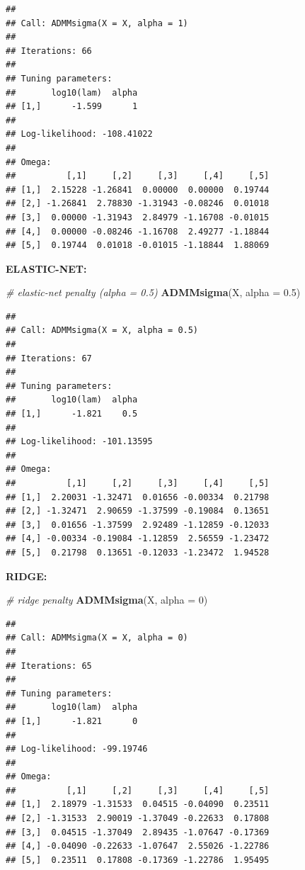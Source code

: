 \documentclass[12pt,]{book}
\newenvironment{Shaded}{\begin{snugshade}}{\end{snugshade}}
\newcommand{\CommentTok}[1]{\textcolor[rgb]{0.56,0.35,0.01}{\textit{#1}}}
\newcommand{\DataTypeTok}[1]{\textcolor[rgb]{0.13,0.29,0.53}{#1}}
\newcommand{\DecValTok}[1]{\textcolor[rgb]{0.00,0.00,0.81}{#1}}
\newcommand{\FloatTok}[1]{\textcolor[rgb]{0.00,0.00,0.81}{#1}}
\newcommand{\KeywordTok}[1]{\textcolor[rgb]{0.13,0.29,0.53}{\textbf{#1}}}
\newcommand{\NormalTok}[1]{#1}
\theoremstyle{definition}
\theoremstyle{definition}
\theoremstyle{definition}
\theoremstyle{remark}
\begin{document}
\begin{verbatim}
## 
## Call: ADMMsigma(X = X, alpha = 1)
## 
## Iterations: 66
## 
## Tuning parameters:
##       log10(lam)  alpha
## [1,]      -1.599      1
## 
## Log-likelihood: -108.41022
## 
## Omega:
##          [,1]     [,2]     [,3]     [,4]     [,5]
## [1,]  2.15228 -1.26841  0.00000  0.00000  0.19744
## [2,] -1.26841  2.78830 -1.31943 -0.08246  0.01018
## [3,]  0.00000 -1.31943  2.84979 -1.16708 -0.01015
## [4,]  0.00000 -0.08246 -1.16708  2.49277 -1.18844
## [5,]  0.19744  0.01018 -0.01015 -1.18844  1.88069
\end{verbatim}

\vspace{0.5cm}

\textbf{ELASTIC-NET:}

\vspace{0.5cm}

\begin{Shaded}
\begin{Highlighting}[]
\CommentTok{# elastic-net penalty (alpha = 0.5)}
\KeywordTok{ADMMsigma}\NormalTok{(X, }\DataTypeTok{alpha =} \FloatTok{0.5}\NormalTok{)}
\end{Highlighting}
\end{Shaded}

\begin{verbatim}
## 
## Call: ADMMsigma(X = X, alpha = 0.5)
## 
## Iterations: 67
## 
## Tuning parameters:
##       log10(lam)  alpha
## [1,]      -1.821    0.5
## 
## Log-likelihood: -101.13595
## 
## Omega:
##          [,1]     [,2]     [,3]     [,4]     [,5]
## [1,]  2.20031 -1.32471  0.01656 -0.00334  0.21798
## [2,] -1.32471  2.90659 -1.37599 -0.19084  0.13651
## [3,]  0.01656 -1.37599  2.92489 -1.12859 -0.12033
## [4,] -0.00334 -0.19084 -1.12859  2.56559 -1.23472
## [5,]  0.21798  0.13651 -0.12033 -1.23472  1.94528
\end{verbatim}

\newpage

\textbf{RIDGE:}

\vspace{0.5cm}

\begin{Shaded}
\begin{Highlighting}[]
\CommentTok{# ridge penalty}
\KeywordTok{ADMMsigma}\NormalTok{(X, }\DataTypeTok{alpha =} \DecValTok{0}\NormalTok{)}
\end{Highlighting}
\end{Shaded}

\begin{verbatim}
## 
## Call: ADMMsigma(X = X, alpha = 0)
## 
## Iterations: 65
## 
## Tuning parameters:
##       log10(lam)  alpha
## [1,]      -1.821      0
## 
## Log-likelihood: -99.19746
## 
## Omega:
##          [,1]     [,2]     [,3]     [,4]     [,5]
## [1,]  2.18979 -1.31533  0.04515 -0.04090  0.23511
## [2,] -1.31533  2.90019 -1.37049 -0.22633  0.17808
## [3,]  0.04515 -1.37049  2.89435 -1.07647 -0.17369
## [4,] -0.04090 -0.22633 -1.07647  2.55026 -1.22786
## [5,]  0.23511  0.17808 -0.17369 -1.22786  1.95495
\end{verbatim}
\end{document}

